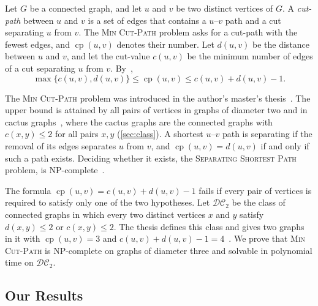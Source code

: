 \documentclass[pdflatex,sn-mathphys-num]{sn-jnl}%
\theoremstyle{thmstyleone}%
\theoremstyle{thmstyletwo}%
\theoremstyle{thmstylethree}%
\newcommand{\cp}{\operatorname{cp}}%
\newcommand{\DC}{\mathcal{DC}_2}%
\newcommand{\MinCutPath}{\textsc{Min Cut-Path}}%
\newcommand{\SSP}{\textsc{Separating Shortest Path}}%
\begin{document}
Let $G$ be a connected graph, and let $u$ and $v$ be two distinct vertices of $G$.
A \emph{cut-path} between $u$ and $v$ is a set of edges that contains a $u$--$v$ path and a cut separating $u$ from $v$.
The \MinCutPath{} problem asks for a cut-path with the fewest edges, and $\cp(u, v)$ denotes their number.
Let $d(u, v)$ be the distance between $u$ and $v$, and let the cut-value $c(u, v)$ be the minimum number of edges of a cut separating $u$ from $v$.
By~\cite[Lemma~2.3]{Michel2026MinCutPath},
\[
\max\{c(u, v), d(u, v)\} \leq \cp(u, v) \leq c(u, v) + d(u, v) - 1.
\]

The \MinCutPath{} problem was introduced in the author's master's thesis~\cite{Michel2025MinCutPath}.
The upper bound is attained by all pairs of vertices in graphs of diameter two and in cactus graphs~\cite[Theorems~5.5 and~6.2]{Michel2026MinCutPath}, where the cactus graphs are the connected graphs with $c(x, y) \leq 2$ for all pairs $x, y$ (\cref{sec:class}).
A shortest $u$--$v$ path is separating if the removal of its edges separates $u$ from $v$, and $\cp(u, v) = d(u, v)$ if and only if such a path exists.
Deciding whether it exists, the \SSP{} problem, is NP-complete~\cite[Theorem~3.10]{Michel2026MinCutPath}.

The formula $\cp(u, v) = c(u, v) + d(u, v) - 1$ fails if every pair of vertices is required to satisfy only one of the two hypotheses.
Let $\DC$ be the class of connected graphs in which every two distinct vertices $x$ and $y$ satisfy $d(x, y) \leq 2$ or $c(x, y) \leq 2$.
The thesis defines this class and gives two graphs in it with $\cp(u, v) = 3$ and $c(u, v) + d(u, v) - 1 = 4$~\cite[Definition~37 and Figure~3.3]{Michel2025MinCutPath}.
We prove that \MinCutPath{} is NP-complete on graphs of diameter three and solvable in polynomial time on $\DC$.

\subsection{Our Results}\label{sec:results}
\end{document}
